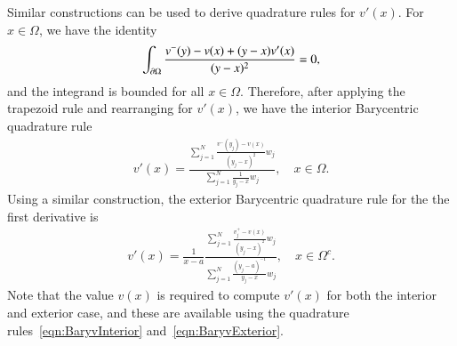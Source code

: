 \documentclass[preprint, 10pt]{elsarticle}
\begin{document}
Similar constructions can be used to derive quadrature rules
for $v'(x)$.  For $x \in \Omega$, we have the identity
\begin{align}
  \int_{{\partial}\Omega} \frac{v^-(y) - v(x) + (y-x)v'(x)}{(y - x)^2} = 0,
\end{align}
and the integrand is bounded for all $x \in \Omega$.  Therefore, after
applying the trapezoid rule and rearranging for $v'(x)$, we have the
interior Barycentric quadrature rule
\begin{align}
  v'(x) = \frac{\sum\limits_{j=1}^{N}
    \frac{v^{-}(y_j) - v(x)}{(y_j-x)^2} w_j}
  {\sum\limits_{j=1}^{N} \frac{1}{y_j-x} w_j}, 
  \quad x \in \Omega.
  \label{eqn:BaryvprimeInterior}
\end{align}
Using a similar construction, the exterior Barycentric quadrature rule
for the the first derivative is
\begin{align}
  v'(x) = \frac{1}{x-a} \frac{\sum\limits_{j=1}^N
    \frac{v^+_j - v(x)}{(y_j - x)^2} w_j}
    {\sum\limits_{j=1}^N \frac{(y_j-a)^{-1}}{y_j - x} w_j},
    \quad x \in \Omega^c.
  \label{eqn:BaryvprimeExterior}
\end{align}
Note that the value $v(x)$ is required to compute $v'(x)$ for both the
interior and exterior case, and these are available using the quadrature
rules~\eqref{eqn:BaryvInterior} and~\eqref{eqn:BaryvExterior}.
\end{document}
